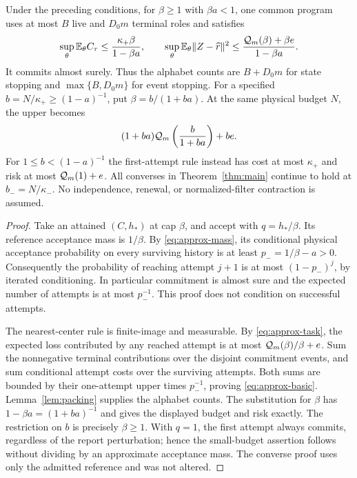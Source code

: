 \begin{theorem}\label{thm:approx}
Under the preceding conditions, for $\beta\ge1$ with $\beta a<1$, one common program uses at most $B$ live and $D_0m$ terminal roles and satisfies
\begin{equation}\label{eq:approx-basic}
 \sup_\theta\mathbb E_\theta C_\tau\le\frac{\kappa_+\beta}{1-\beta a},
 \qquad
 \sup_\theta\mathbb E_\theta\|Z-\widehat r\|^2
 \le\frac{\mathcal Q_m(\beta)+\beta e}{1-\beta a}.
\end{equation}
It commits almost surely. Thus the alphabet counts are $B+D_0m$ for state stopping and $\max\{B,D_0m\}$ for event stopping. For a specified $b=N/\kappa_+\ge(1-a)^{-1}$, put $\beta=b/(1+ba)$. At the same physical budget $N$, the upper becomes
\begin{equation}\label{eq:approx-budget}
 (1+ba)\mathcal Q_m\left(\frac b{1+ba}\right)+be.
\end{equation}
For $1\le b<(1-a)^{-1}$ the first-attempt rule instead has cost at most $\kappa_+$ and risk at most $\mathcal Q_m(1)+e$. All converses in Theorem~\ref{thm:main} continue to hold at $b_-=N/\kappa_-$. No independence, renewal, or normalized-filter contraction is assumed.
\end{theorem}
\begin{proof}
Take an attained $(C,h_*)$ at cap $\beta$, and accept with $q=h_*/\beta$. Its reference acceptance mass is $1/\beta$. By \eqref{eq:approx-mass}, its conditional physical acceptance probability on every surviving history is at least $p_-=1/\beta-a>0$. Consequently the probability of reaching attempt $j+1$ is at most $(1-p_-)^j$, by iterated conditioning. In particular commitment is almost sure and the expected number of attempts is at most $p_-^{-1}$. This proof does not condition on successful attempts.

The nearest-center rule is finite-image and measurable. By \eqref{eq:approx-task}, the expected loss contributed by any reached attempt is at most $\mathcal Q_m(\beta)/\beta+e$. Sum the nonnegative terminal contributions over the disjoint commitment events, and sum conditional attempt costs over the surviving attempts. Both sums are bounded by their one-attempt upper times $p_-^{-1}$, proving \eqref{eq:approx-basic}. Lemma~\ref{lem:packing} supplies the alphabet counts. The substitution for $\beta$ has $1-\beta a=(1+ba)^{-1}$ and gives the displayed budget and risk exactly. The restriction on $b$ is precisely $\beta\ge1$. With $q=1$, the first attempt always commits, regardless of the report perturbation; hence the small-budget assertion follows without dividing by an approximate acceptance mass. The converse proof uses only the admitted reference and was not altered.
\end{proof}

